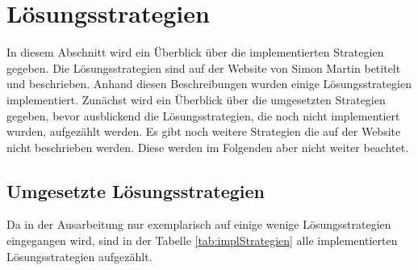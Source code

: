 \section{Lösungsstrategien}

In diesem Abschnitt wird ein Überblick über die implementierten Strategien gegeben. Die Lösungsstrategien sind auf der Website von Simon Martin \cite{martin} betitelt und beschrieben. Anhand diesen Beschreibungen wurden einige Lösungsstrategien implementiert. Zunächst wird ein Überblick über die umgesetzten Strategien gegeben, bevor ausblickend die Lösungsstrategien, die noch nicht implementiert wurden, aufgezählt werden. Es gibt noch weitere Strategien die auf der Website nicht beschrieben werden. Diese werden im Folgenden aber nicht weiter beachtet.

\subsection{Umgesetzte Lösungsstrategien}
Da in der Ausarbeitung nur exemplarisch auf einige wenige Lösungsstrategien eingegangen wird, sind in der Tabelle \ref{tab:implStrategien} alle implementierten Lösungsstrategien aufgezählt.
